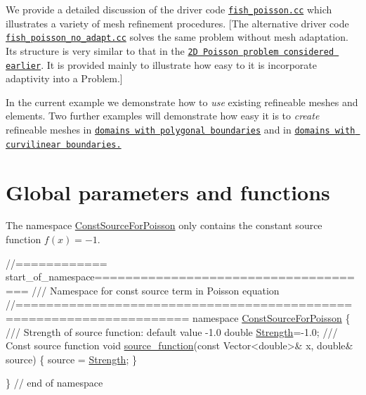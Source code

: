 We provide a detailed discussion of the driver code \href{../../../../demo_drivers/poisson/fish_poisson/fish_poisson.cc}{\tt fish\+\_\+poisson.\+cc} which illustrates a variety of mesh refinement procedures. \mbox{[}The alternative driver code \href{../../../../demo_drivers/poisson/fish_poisson/fish_poisson_no_adapt.cc}{\tt fish\+\_\+poisson\+\_\+no\+\_\+adapt.\+cc} solves the same problem without mesh adaptation. Its structure is very similar to that in the \href{../../../poisson/two_d_poisson/html/index.html}{\tt 2D Poisson problem considered earlier}. It is provided mainly to illustrate how easy to it is incorporate adaptivity into a {\ttfamily Problem}.\mbox{]}

In the current example we demonstrate how to {\itshape use} existing refineable meshes and elements. Two further examples will demonstrate how easy it is to {\itshape create} refineable meshes in \href{../../../poisson/two_d_poisson_adapt/html/index.html}{\tt domains with polygonal boundaries} and in \href{../../../poisson/fish_poisson2/html/index.html}{\tt domains with curvilinear boundaries.}



 

\hypertarget{index_global}{}\section{Global parameters and functions}\label{index_global}
The namespace {\ttfamily \hyperlink{namespaceConstSourceForPoisson}{Const\+Source\+For\+Poisson}} only contains the constant source function $ f(x)=-1 $.

 
\begin{DoxyCodeInclude}
\textcolor{comment}{//============ start\_of\_namespace=====================================}
\textcolor{comment}{/// Namespace for const source term in Poisson equation}
\textcolor{comment}{}\textcolor{comment}{//====================================================================}
\textcolor{keyword}{namespace }\hyperlink{namespaceConstSourceForPoisson}{ConstSourceForPoisson}
\{ 
 \textcolor{comment}{}
\textcolor{comment}{ /// Strength of source function: default value -1.0}
\textcolor{comment}{} \textcolor{keywordtype}{double} \hyperlink{namespaceConstSourceForPoisson_add351c5acab2561d68d1fc9ec3d5fc5e}{Strength}=-1.0;
\textcolor{comment}{}
\textcolor{comment}{/// Const source function}
\textcolor{comment}{} \textcolor{keywordtype}{void} \hyperlink{namespaceConstSourceForPoisson_aeaa1153817bde9598372b803342f3299}{source\_function}(\textcolor{keyword}{const} Vector<double>& x, \textcolor{keywordtype}{double}& source)
 \{
  source = \hyperlink{namespaceConstSourceForPoisson_add351c5acab2561d68d1fc9ec3d5fc5e}{Strength};
 \}

\} \textcolor{comment}{// end of namespace}

\end{DoxyCodeInclude}




